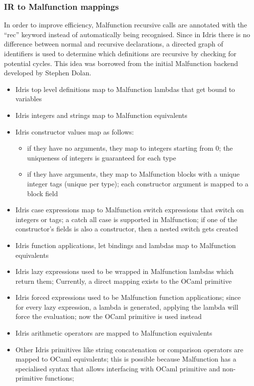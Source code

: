 \subsubsection{IR to Malfunction mappings}
In order to improve efficiency, Malfunction recursive calls are annotated with the ``rec'' keyword instead of automatically being recognised. Since in Idris there is no difference
between normal and recursive declarations, a directed graph of
identifiers is used to determine which definitions are
recursive by checking for potential cycles. This idea was borrowed
from the initial Malfunction backend developed by Stephen Dolan.

\begin{itemize}
    \item Idris top level definitions map to Malfunction lambdas that get bound to variables
    \item Idris integers and strings map to Malfunction equivalents
    \item Idris constructor values map as follows:
          \begin{itemize}
              \item if they have no arguments, they map to integers starting from 0; the uniqueness of integers is guaranteed for each type
              \item if they have arguments, they map to Malfunction blocks with a unique integer tags (unique per type); each constructor argument is mapped to a block field
          \end{itemize}
    \item Idris case expressions map to Malfunction switch expressions
          that switch on integers or tags; a catch all case is supported in Malfunction; if one of the constructor's fields is also a constructor, then a nested switch gets created
    \item Idris function applications, let bindings and lambdas map to Malfunction equivalents
    \item Idris lazy expressions used to be wrapped in Malfunction lambdas which return them; Currently, a direct mapping exists to the
          OCaml primitive
    \item Idris forced expressions used to be Malfunction function applications; since for every lazy expression, a lambda is generated, applying the lambda will force the evaluation; now the OCaml primitive is used
          instead
    \item Idris arithmetic operators are mapped to Malfunction equivalents
    \item Other Idris primitives like string concatenation or comparison operators are mapped to OCaml equivalents; this is possible because Malfunction has a specialised syntax that allows interfacing with OCaml primitive and non-primitive functions;
\end{itemize}


